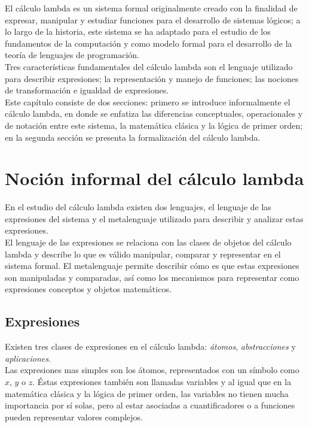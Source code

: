 El cálculo lambda es un sistema formal originalmente creado con la finalidad de
expresar, manipular y estudiar funciones para el desarrollo de sistemas lógicos;
a lo largo de la historia, este sistema se ha adaptado para el estudio de los
fundamentos de la computación y como modelo formal para el desarrollo de la
teoría de lenguajes de programación. \\

Tres características fundamentales del cálculo lambda son el lenguaje utilizado
para describir expresiones; la representación y manejo de funciones; las
nociones de transformación e igualdad de expresiones. \\

Este capítulo consiste de dos secciones: primero se introduce informalmente el
cálculo lambda, en donde se enfatiza las diferencias conceptuales, operacionales
y de notación entre este sistema, la matemática clásica y la lógica de primer
orden; en la segunda sección se presenta la formalización del cálculo lambda. \\

\section{Noción informal del cálculo lambda}

En el estudio del cálculo lambda existen dos lenguajes, el lenguaje de las
expresiones del sistema y el metalenguaje utilizado para describir y analizar
estas expresiones. \\

El lenguaje de las expresiones se relaciona con las clases de objetos del
cálculo lambda y describe lo que es válido manipular, comparar y representar en
el sistema formal. El metalenguaje permite describir cómo es que estas
expresiones son manipuladas y comparadas, así como los mecanismos para
representar como expresiones conceptos y objetos matemáticos. \\

\subsection{Expresiones}

Existen tres clases de expresiones en el cálculo lambda: \emph{átomos},
\emph{abstracciones} y \emph{aplicaciones}. \\

Las expresiones mas simples son los átomos, representados con un símbolo como
\(x\), \(y\) o \(z\). Éstas expresiones también son llamadas variables y al
igual que en la matemática clásica y la lógica de primer orden, las variables no
tienen mucha importancia por sí solas, pero al estar asociadas a cuantificadores
o a funciones pueden representar valores complejos. \\

